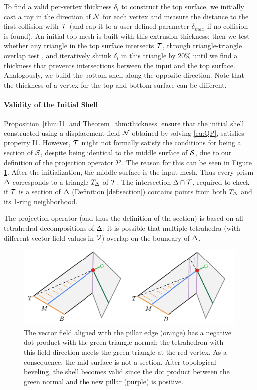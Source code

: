 To find a valid per-vertex thickness $\delta_i$ to construct the top surface, we initially cast a ray in the direction of $\N$ for each vertex and measure the distance to the first collision with $\T$ (and cap it to a user-defined parameter $\delta_{max}$ if no collision is found).
An initial top mesh is built with this extrusion thickness; then we test whether any triangle in the top surface intersects $\T$, through triangle-triangle overlap test \cite{guigue2003fast},
and iteratively shrink $\delta_i$ in this triangle by 20\% until we find a thickness that prevents intersections between the input and the top surface. Analogously, we build the bottom shell along the opposite direction. {Note that the thickness of a vertex for the top and bottom surface can be different.}

\paragraph{Validity of the Initial Shell}
Proposition~\ref{thm:I1} and Theorem~\ref{thm:thickness} ensure that the initial shell constructed using a displacement field $\N$ obtained by solving \eqref{eq:QP}, satisfies property I1. However, $\T$ might not formally satisfy the conditions for being a section of $\S$, despite being identical to the middle surface of $\S$, due to our definition of the projection operator $\P$.
%
The reason for this can be seen in Figure \ref{prism:fig:closed}.
After the initialization, the middle surface is the input mesh. Thus every prism $\Prism$ corresponds to a triangle $T_\Prism$ of $\T$. The intersection $\Prism \cap \T$, required to check if $\T$ is a section of $\Prism$ (Definition \ref{def:section}) contains points from both $T_\Prism$ and its 1-ring neighborhood.

The projection operator (and thus the definition of the section) is based on all tetrahedral decompositions of $\Prism${;} it is possible that multiple tetrahedra (with different vector field values in $\V$) overlap on the boundary of $\Prism$. 


\begin{figure}\centering
    \includegraphics[width=0.9\linewidth]{prism-tex/figs/need_to_bevel}
    \caption{The vector field aligned with the pillar edge (orange) has a negative dot product with the green triangle normal; the tetrahedron with this field direction meets the green triangle at the red vertex. As a consequence, the mid-surface is not a section.
    After topological beveling, the shell becomes valid since the dot product between the green normal and the new pillar (purple) is positive.
    }
    \label{prism:fig:closed}
    
\end{figure}

